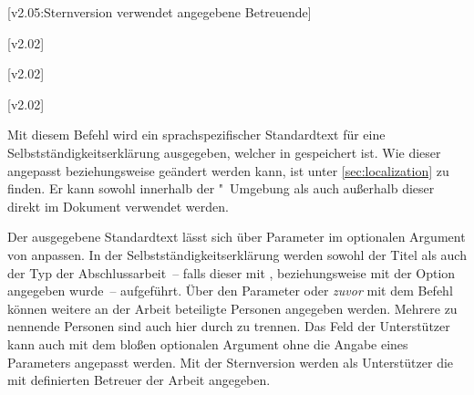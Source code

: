 \begin{DeclareEntity*}{}
\begin{DeclareEntity*}{}
\begin{DeclareEntity*}{}
\begin{Declaration}
  {}
\begin{Declaration}
  {}
  [v2.05:Sternversion verwendet angegebene Betreuende]
\begin{Declaration}
  {}
\begin{Declaration}
  {}
\begin{Declaration}
  {}
\begin{Declaration}
  {}
\begin{Declaration}
  {}
  [v2.02]
\begin{Declaration}
  {}
  [v2.02]
\begin{Declaration}
  {}
  [v2.02]
\begin{Declaration}
  {}
Mit diesem Befehl wird ein sprachspezifischer Standardtext für eine 
Selbstständigkeitserklärung ausgegeben, welcher in  
gespeichert ist. Wie dieser angepasst beziehungsweise geändert werden kann, ist 
unter \autoref{sec:localization} zu finden. Er kann sowohl innerhalb der 
"~Umgebung als auch außerhalb dieser direkt im 
Dokument verwendet werden. 

Der ausgegebene Standardtext lässt sich über Parameter im optionalen Argument 
von  anpassen. In der Selbstständigkeitserklärung werden 
sowohl der Titel als auch der Typ der Abschlussarbeit~-- falls dieser mit 
,  beziehungsweise 
mit der Option  angegeben wurde~-- aufgeführt. Über den 
Parameter  oder \emph{zuvor} mit dem Befehl 
 können weitere an der Arbeit beteiligte Personen angegeben 
werden. Mehrere zu nennende Personen sind auch hier durch  zu 
trennen. Das Feld der Unterstützer kann auch mit dem bloßen optionalen Argument 
ohne die Angabe eines Parameters angepasst werden. 
%
Mit der Sternversion  werden als Unterstützer die mit 
 definierten Betreuer der Arbeit angegeben.


\end{Declaration}
\end{Declaration}
\end{Declaration}
\end{Declaration}
\end{Declaration}
\end{Declaration}
\end{Declaration}
\end{Declaration}
\end{Declaration}
\end{Declaration}
\end{DeclareEntity*}
\end{DeclareEntity*}
\end{DeclareEntity*}
